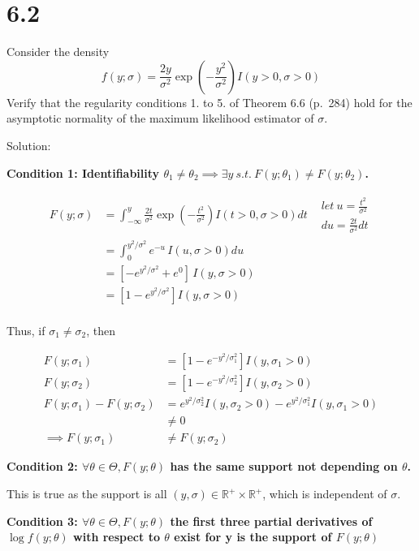 \documentclass[
  letterpaper,
  DIV=11,
  numbers=noendperiod]{scrreprt}
\begin{document}
\hypertarget{section-41}{%
\section{6.2}\label{section-41}}

Consider the density
\[f(y;\sigma) = \frac{2y}{\sigma^2}\exp\left(-\frac {y^2}{\sigma^2}\right) I(y>0,\sigma>0)\]
Verify that the regularity conditions 1. to 5. of Theorem 6.6 (p.~284)
hold for the asymptotic normality of the maximum likelihood estimator of
\(\sigma\).

Solution:

\textbf{Condition 1: Identifiability
\(\theta_1 \neq \theta_2 \implies \exists y ~s.t.~ F(y;\theta_1) \neq F(y;\theta_2)\).}

\[\begin{aligned}
F(y;\sigma) &= \int_{-\infty}^y\frac{2t}{\sigma^2}\exp\left(-\frac {t^2}{\sigma^2}\right) I(t>0,\sigma>0)dt & \substack{let~ u = \frac {t^2}{\sigma^2} \\du = \frac {2t}{\sigma^2}dt}\\
&= \int_{0}^{y^2/\sigma^2} e^{-u} \,I(u,\sigma>0) du \\
&= [-e^{y^2/\sigma^2}+e^0]  \,I(y,\sigma>0) \\
&= [1-e^{y^2/\sigma^2}]I(y,\sigma>0) \\
\end{aligned}\]

Thus, if \(\sigma_1 \neq \sigma_2\), then

\[\begin{aligned}
F(y; \sigma_1) &= [1-e^{-y^2/\sigma_1^2}]I(y,\sigma_1>0) \\
F(y; \sigma_2) &= [1-e^{-y^2/\sigma_2^2}]I(y,\sigma_2>0) \\
F(y; \sigma_1) -F(y; \sigma_2)&=  e^{y^2/\sigma_2^2}I(y,\sigma_2>0)-e^{y^2/\sigma_1^2}I(y,\sigma_1>0) \\
&\neq 0  \\
\implies F(y; \sigma_1) &\neq F(y; \sigma_2)
\end{aligned}
\]

\textbf{Condition 2: \(\forall \theta \in \Theta, F(y;\theta)\) has the
same support not depending on \(\theta\).}

This is true as the support is all
\((y, \sigma) \in \mathbb R^+ \times \mathbb R^+\), which is independent
of \(\sigma\).

\textbf{Condition 3: \(\forall \theta \in \Theta, F(y;\theta)\) the
first three partial derivatives of \(\log f(y;\theta)\) with respect to
\(\theta\) exist for y is the support of \(F(y;\theta)\)}
\end{document}
